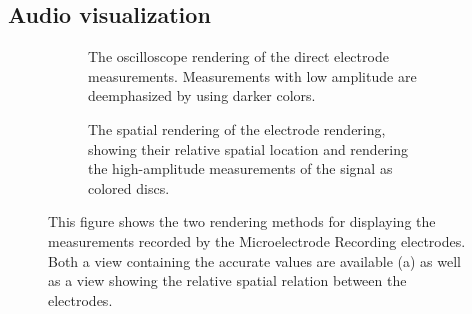 \subsection{Audio visualization} \label{contributions:dbs:audio}
\begin{figure}
\centering
    \begin{subfigure}[b]{0.49\textwidth}
        \caption{The  oscilloscope rendering of the direct electrode measurements. Measurements with low amplitude are deemphasized by using darker colors.}
        \label{contributions:dbs:sound:2d}
    \end{subfigure}
    \hfill
    \begin{subfigure}[b]{0.49\textwidth}
        \caption{The spatial  rendering of the electrode rendering, showing their relative spatial location and rendering the high-amplitude measurements of the signal as colored discs.}
        \label{contributions:dbs:sound:3d}
    \end{subfigure}
    \caption{This figure shows the two rendering methods for displaying the measurements recorded by the Microelectrode Recording electrodes. Both a view containing the accurate values are available (a) as well as a view showing the relative spatial relation between the electrodes.}
    \label{contributions:dbs:sound}
\end{figure}

